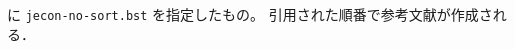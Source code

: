\documentclass[platex]{jsarticle}
\begin{document}
\verb|| に \verb|jecon-no-sort.bst| を指定したもの。
引用された順番で参考文献が作成される．
\vspace*{1em}\\



\nocite{*}



%

\end{document}
